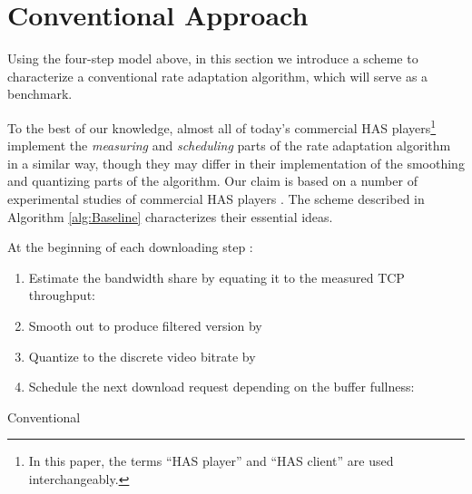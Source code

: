 \documentclass[conference]{IEEEtran}
\theoremstyle{plain}
\theoremstyle{definition}
\theoremstyle{plain}
\theoremstyle{plain}
\begin{document}
\section{Conventional Approach \label{sec:Existing-Rate-Adaptation}}

Using the four-step model above, in this section we introduce a scheme
to characterize a conventional rate adaptation algorithm, which will
serve as a benchmark.

To the best of our knowledge, almost all of today's commercial HAS
players\footnote{In this paper, the terms ``HAS player'' and ``HAS client'' are
used interchangeably.} implement the \emph{measuring} and \emph{scheduling} parts of the
rate adaptation algorithm in a similar way, though they may differ
in their implementation of the smoothing and quantizing parts of the
algorithm. Our claim is based on a number of experimental studies
of commercial HAS players \cite{akhashabi12SPIC,Huang:IMC12,Jiang:CoNext12}.
The scheme described in Algorithm \ref{alg:Baseline} characterizes
their essential ideas.

\begin{algorithm}
At the beginning of each downloading step : 
\begin{enumerate}
\item Estimate the bandwidth share  by equating it to the measured
TCP throughput: 


\item Smooth out  to produce filtered version 
by 


\item Quantize  to the discrete video bitrate 
by 


\item Schedule the next download request depending on the buffer fullness:


\end{enumerate}
\caption{Conventional\label{alg:Baseline}}
\vspace{-0.1in}
\end{algorithm}
\end{document}
